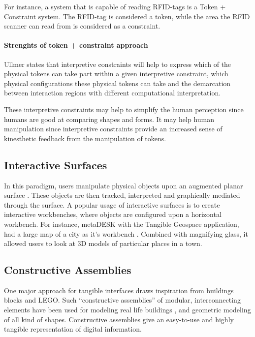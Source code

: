For instance, a system that is capable of reading RFID-tags is a Token + Constraint system. The RFID-tag is considered a token, while the area the RFID scanner can read from is considered as a constraint.  




\paragraph{Strenghts of token + constraint approach}

Ullmer states that interpretive constraints will help to express which of the physical tokens can take part within a given interpretive constraint, which physical configurations these physical tokens can take and the demarcation between interaction regions with different computational interpretation.

These interpretive constraints may help to simplify the human perception since humans are good at comparing shapes and forms. 
It may help human manipulation since interpretive constraints provide an increased sense of kinesthetic feedback from the manipulation of tokens. 

\subsection{Interactive Surfaces}
\label{sec:interactivesurfaces}
In this paradigm, users manipulate physical objects upon an augmented planar surface \cite{ullmer2002tangible}. These objects are then tracked, interpreted and graphically mediated through the surface. A popular usage of interactive surfaces is to create interactive workbenches, where objects are configured upon a horizontal workbench. For instance, metaDESK with the Tangible Geospace application, had a large map of a city as it's workbench \cite{ullmer1997metadesk}. Combined with magnifying glass, it allowed users to look at 3D models of particular places in a town. 



\subsection{Constructive Assemblies}
\label{sec:constructiveassemblies}
One major approach for tangible interfaces draws inspiration from buildings blocks and LEGO\texttrademark. Such ``constructive assemblies'' of modular, interconnecting elements have been used for modeling real life buildings \cite{aish1984architecture}, and geometric modeling of all kind of shapes\cite{anderson2000tangible}. Constructive assemblies give an easy-to-use and highly tangible representation of digital information. 

